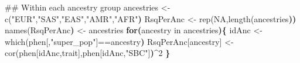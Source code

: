 \documentclass[
  letterpaper,
  DIV=11,
  numbers=noendperiod]{scrartcl}
\newenvironment{Shaded}{\begin{snugshade}}{\end{snugshade}}
\newcommand{\CommentTok}[1]{\textcolor[rgb]{0.37,0.37,0.37}{#1}}
\newcommand{\ControlFlowTok}[1]{\textcolor[rgb]{0.00,0.23,0.31}{\textbf{#1}}}
\newcommand{\ErrorTok}[1]{\textcolor[rgb]{0.68,0.00,0.00}{#1}}
\newcommand{\ExtensionTok}[1]{\textcolor[rgb]{0.00,0.23,0.31}{#1}}
\newcommand{\KeywordTok}[1]{\textcolor[rgb]{0.00,0.23,0.31}{\textbf{#1}}}
\newcommand{\NormalTok}[1]{\textcolor[rgb]{0.00,0.23,0.31}{#1}}
\newcommand{\OperatorTok}[1]{\textcolor[rgb]{0.37,0.37,0.37}{#1}}
\newcommand{\StringTok}[1]{\textcolor[rgb]{0.13,0.47,0.30}{#1}}
\newcommand{\VariableTok}[1]{\textcolor[rgb]{0.07,0.07,0.07}{#1}}
\begin{document}
\begin{Shaded}
\begin{Highlighting}[]
\CommentTok{\#\# Within each ancestry group}
\ExtensionTok{ancestries} \OperatorTok{\textless{}}\NormalTok{{-} c}\ErrorTok{(}\StringTok{"EUR"}\ExtensionTok{,}\StringTok{"SAS"}\ExtensionTok{,}\StringTok{"EAS"}\ExtensionTok{,}\StringTok{"AMR"}\ExtensionTok{,}\StringTok{"AFR"}\KeywordTok{)}
\ExtensionTok{RsqPerAnc}  \OperatorTok{\textless{}}\NormalTok{{-} rep}\ErrorTok{(}\ExtensionTok{NA,length}\ErrorTok{(}\ExtensionTok{ancestries}\KeywordTok{))}
\ExtensionTok{names}\ErrorTok{(}\ExtensionTok{RsqPerAnc}\KeywordTok{)} \OperatorTok{\textless{}}\NormalTok{{-} }\ExtensionTok{ancestries}
\ControlFlowTok{for}\KeywordTok{(}\ExtensionTok{ancestry}\NormalTok{ in ancestries}\KeywordTok{)\{}
  \ExtensionTok{idAnc} \OperatorTok{\textless{}}\NormalTok{{-} which}\ErrorTok{(}\VariableTok{phen}\OperatorTok{[}\NormalTok{,}\StringTok{"super\_pop"}\OperatorTok{]=}\NormalTok{=ancestry}\KeywordTok{)}
  \VariableTok{RsqPerAnc}\OperatorTok{[}\NormalTok{ancestry}\OperatorTok{]} \OperatorTok{\textless{}}\NormalTok{{-} }\ExtensionTok{cor}\ErrorTok{(}\VariableTok{phen}\OperatorTok{[}\NormalTok{idAnc,trait}\OperatorTok{]}\ExtensionTok{,phen[idAnc,}\StringTok{"SBC"}\ExtensionTok{]}\KeywordTok{)}\ExtensionTok{\^{}2}
\KeywordTok{\}}
\end{Highlighting}
\end{Shaded}
\end{document}
